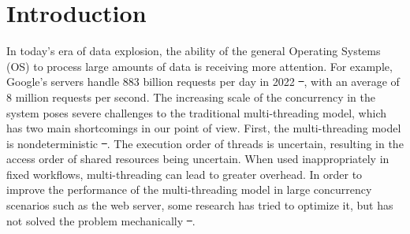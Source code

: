 \documentclass[sigconf,review,anonymous]{acmart}
\providecommand{\DIFdel}[1]{{\protect\color{red}\sout{#1}}}                      %
\providecommand{\DIFdelbegin}{} %
\providecommand{\DIFdelend}{} %
\begin{document}

\maketitle

\section{Introduction}
\label{section: introduction}

In today's era of data explosion, the ability of the general Operating Systems (OS) to process large amounts of data is receiving more attention. For example, Google's servers handle 883 billion requests per day in 2022 \DIFdelbegin \DIFdel{~}\DIFdelend \cite{google-search-statistics}, with an average of 8 million requests per second. The increasing scale of the concurrency in the system poses severe challenges to the traditional multi-threading model, which has two main shortcomings in our point of view. First, the multi-threading model is nondeterministic \DIFdelbegin \DIFdel{~}\DIFdelend \cite{Lee:EECS-2006-1}. The execution order of threads is uncertain, resulting in the access order of shared resources being uncertain. When used inappropriately in fixed workflows, multi-threading can lead to greater overhead. In order to improve the performance of the multi-threading model in large concurrency scenarios such as the web server, some research has tried to optimize it, but has not solved the problem mechanically \DIFdelbegin \DIFdel{~}\DIFdelend \cite{li_combining_2007, howell_cooperative_2002}.
\end{document}

